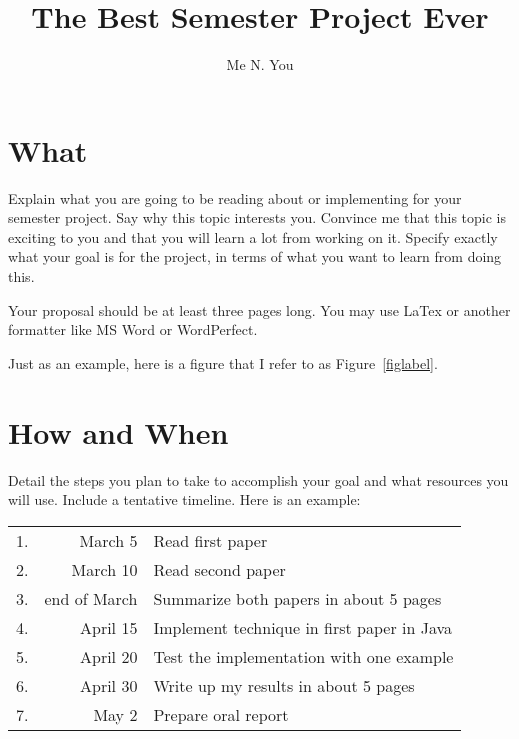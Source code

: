 \documentclass{article}
\begin{document}
\title{The Best Semester Project Ever}
\author{Me N. You}
\maketitle

\section{What}

Explain what you are going to be reading about or implementing for
your semester project.  Say why this topic interests you.  Convince me
that this topic is exciting to you and that you will learn a lot from
working on it.  Specify exactly what your goal is for the project, in
terms of what you want to learn from doing this.

Your proposal should be at least three pages long.  You may use LaTex
or another formatter like MS Word or WordPerfect.

Just as an example, here is a figure that I refer to as
Figure~\ref{figlabel}.



\section{How and When}

Detail the  steps you plan  to take to  accomplish your goal  and what
resources you  will use.   Include a tentative  timeline.  Here  is an
example:

\begin{center}
\begin{tabular}{rrl}
1.  & March 5 & Read first paper\\
2.  & March 10 & Read second paper\\
3.  & end of March & Summarize both papers in about 5 pages\\
4.  & April 15 & Implement technique in first paper in Java\\
5.  & April 20 & Test the implementation with one example\\
6.  & April 30 & Write up my results in about 5 pages\\
7. & May 2 & Prepare oral report
\end{tabular}
\end{center}
\end{document}
